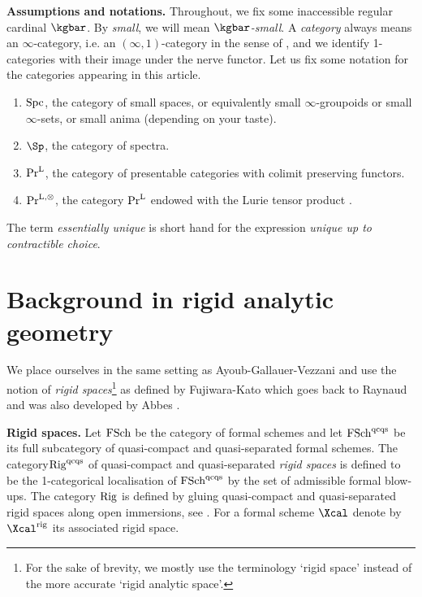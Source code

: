 \documentclass[colorinlistoftodos,article,11pt,reqno]{article}
\newcommand{\rig}{\textup{rig}}
\newcommand{\Rig}{\textup{Rig}}
\newcommand{\FSch}{\textup{FSch}}
\newcommand{\Spc}{\textup{Spc}}
\newcommand{\qcqs}{\textup{qcqs}}
\newcommand{\PrL}{\textup{Pr}^{\textup{L}}}
\newcommand{\PrLO}{\textup{Pr}^{\textup{L},\otimes}}
\begin{document}
\vspace{6pt}\noindent\textbf{Assumptions and notations.}
Throughout, we fix some inaccessible regular cardinal $\kgbar$. By \textit{small}, we will mean \textit{$\kgbar$-small}. 
A \emph{category} always means an $\infty$-category, i.e. an $(\infty,1)$-category in the sense of \cite{HTT}, and we identify 1-categories with their image under the nerve functor.
Let us fix some notation for the categories appearing in this article.
\begin{enumerate}%
    \item[$\bullet$] $\Spc$, the category of small spaces, or equivalently small $\infty$-groupoids or small $\infty$-sets, or small anima (depending on your taste).
    \item[$\bullet$] $\Sp$, the category of spectra.
    \item[$\bullet$] $\PrL$, the category of presentable categories with colimit preserving functors.
    \item[$\bullet$] $\PrLO$, the category $\PrL$ endowed with the Lurie tensor product \cite[\S 4.8.1]{HA}.
\end{enumerate}
The term \emph{essentially unique} is short hand for the expression \emph{unique up to contractible choice}.






\section{Background in rigid analytic geometry}

We place ourselves in the same setting as Ayoub-Gallauer-Vezzani \cite[\S 1]{AGV} and use the notion of \emph{rigid spaces}\footnote{For the sake of brevity, we mostly use the terminology `rigid space' instead of the more accurate `rigid analytic space'.} as defined by Fujiwara-Kato \cite{fuji-kato} which goes back to Raynaud \cite{raynaud} and was also developed by Abbes \cite{egr}. 

\vspace{6pt}\noindent\textbf{Rigid spaces.} Let $\FSch$ be the category of formal schemes and let $\FSch^\qcqs$ be its full subcategory of quasi-compact and quasi-separated formal schemes. The category\linebreak $\Rig^\qcqs$ of quasi-compact and quasi-separated \emph{rigid spaces} is defined to be the 1\hyp{}categorical localisation of $\FSch^\qcqs$ by the set of admissible formal blow-ups. The  category $\Rig$ is  defined by gluing quasi-compact and quasi-separated rigid spaces along open immersions, see \cite[ch.~II, \S 2.2~(c)]{fuji-kato}. For a formal scheme $\Xcal$ denote by $\Xcal^\rig$ its associated rigid space.
\end{document}
